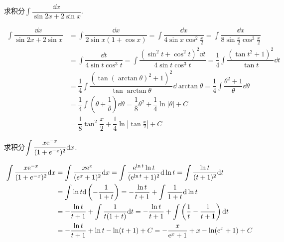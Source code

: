 \newpage
\begin{example}{}{}
    求积分$\displaystyle \int\dfrac{\dd x}{\sin 2x+2\sin x}$.
\end{example}
\begin{solution}
    \begin{align*}
        \int\dfrac{\dd x}{\sin 2x+2\sin x}&=\int\dfrac{\dd x}{2\sin x(1+\cos x)}=\int\dfrac{\dd x}{4\sin x\cos^2\frac{x}{2}}=\int\dfrac{\dd x}{8\sin\frac{x}{2}\cos^3\frac{x}{2}}\\
        &=\int\dfrac{\dd t}{4\sin t\cos^3t}=\int\dfrac{(\sin^2 t+\cos^2 t)^2\dd t}{4\sin t\cos^3t}=\dfrac14\int\dfrac{(\tan t^2+1)^2}{\tan t}\dd t\\
        &=\dfrac14\int\dfrac{(\tan(\arctan \theta)^2+1)^2}{\tan\arctan\theta}\dd\arctan\theta=\dfrac14\int\dfrac{\theta^2+1}{\theta}\dd\theta\\
        &=\dfrac14\int\left(\theta+\dfrac1\theta\right)\dd\theta=\dfrac18\theta^2+\dfrac14\ln|\theta|+C\\
        &=\dfrac18\tan^2\dfrac{x}{2}+\dfrac14\ln|\tan\frac{x}{2}|+C
    \end{align*}
\end{solution}
\begin{example}{}{}
    求积分$\displaystyle \int\dfrac{x\text{e}^{-x}}{(1+e^{-x})^2}\text{d} x$.
\end{example}
\begin{solution}
    \begin{align*}
        \int\dfrac{x\text{e}^{-x}}{(1+e^{-x})^2}\text{d} x&=\int\dfrac{x\text{e}^x}{(e^x+1)^2}\text{d} x=\int\dfrac{\text{e}^{\ln t}\ln t}{(\text{e}^{\ln t}+1)^2}\text{d}\ln t=\int\dfrac{\ln t}{(t+1)^2}\text{d} t\\
        &=\int\ln t\text{d}\left(-\dfrac{1}{1+t}\right)=-\dfrac{\ln t}{t+1}+\int\dfrac{1}{1+t}\text{d} \ln t\\
        &=-\dfrac{\ln t}{t+1}+\int\dfrac{1}{t(1+t)}\text{d} t=-\dfrac{\ln t}{t+1}+\int\left(\dfrac{1}{t}-\dfrac{1}{t+1}\right)\text{d} t\\
        &=-\dfrac{\ln t}{t+1}+\ln t-\ln(t+1)+C=-\dfrac{x}{\text{e}^x+1}+x-\ln(\text{e}^x+1)+C\\
    \end{align*}
\end{solution}